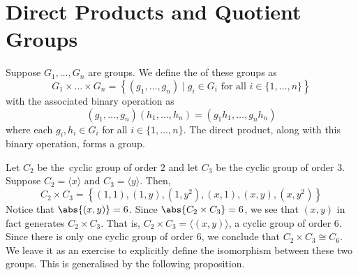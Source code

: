 \section{Direct Products and Quotient Groups}

\begin{defn}
    Suppose $G_1, \ldots, G_n$ are groups. We define the  of these groups as 
    \[
        G_1 \times \ldots \times G_n = \left\{ (g_1, \ldots, g_n) \mid g_i \in G_i \text{ for all } i \in \{1, \ldots, n\} \right\}
    \]
    with the associated binary operation as
    \[
        (g_1, \ldots, g_n) (h_1, \ldots, h_n) = (g_1h_1, \ldots, g_nh_n)
    \]
    where each $g_i, h_i \in G_i$ for all $i \in \{1, \ldots, n\}$. The direct product, along with this binary operation, forms a group.
\end{defn}
    
\begin{ex} \label{ex:C6}
    Let $C_2$ be the\footnotemark\ cyclic group of order $2$ and let $C_3$ be the cyclic group of order $3$. Suppose $C_2 = \langle x \rangle$ and $C_3 = \langle y \rangle$. Then,
\[
    C_2 \times C_3 = \left\{ (1,1), (1,y), (1,y^2), (x,1), (x,y), (x,y^2) \right\}
\]
Notice that $\abs{(x,y)} = 6$. Since $\abs{C_2 \times C_3} = 6$, we see that $(x,y)$ in fact generates $C_2 \times C_3$. That is, $C_2 \times C_3 = \langle (x,y) \rangle$, a cyclic group of order $6$. Since there is only one cyclic group of order $6$, we conclude that $C_2 \times C_3 \cong C_6$. We leave it as an exercise to explicitly define the isomorphism between these two groups. This is generalised by the following proposition.
\end{ex}

